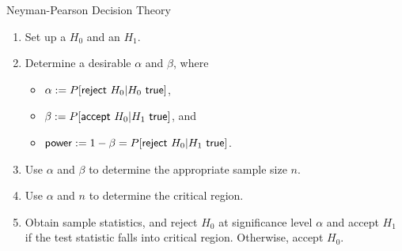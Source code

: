 \begin{frame}{Neyman-Pearson Decision Theory}

\begin{enumerate}
	\justifying
	\item Set up a  $H_0$ and an  $H_1$.
	\item Determine a desirable $\alpha$ and $\beta$, where
	\begin{itemize}
		\item $\alpha := P[\U{reject\ } H_0|H_0 \U{\ true}]$,
		\item $\beta := P[\U{accept\ } H_0|H_1 \U{\ true}]$, and
		\item $\U{power} := 1 - \beta = P[\U{reject\ } H_0|H_1 \U{\ true}]$.
	\end{itemize}
	\item Use $\alpha$ and $\beta$ to determine the appropriate sample size $n$. \highlightr{$\Delta$}
	\item Use $\alpha$ and $n$ to determine the critical region. \highlightr{$\Delta$}
	\item Obtain sample statistics, and reject $H_0$ at significance level $\alpha$ and accept $H_1$ if the test statistic falls into critical region. Otherwise, accept $H_0$.
\end{enumerate}

\end{frame}

